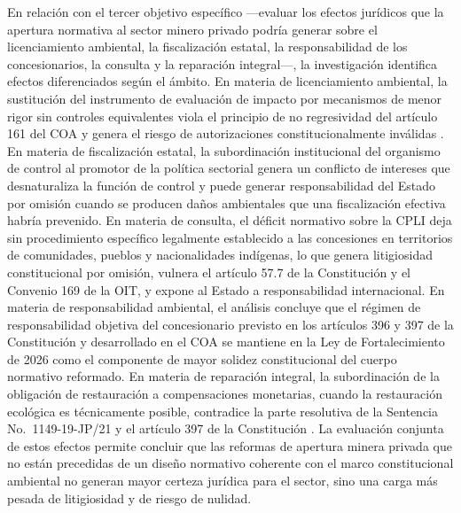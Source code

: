 En relación con el tercer objetivo específico —evaluar los efectos jurídicos que la apertura normativa al sector minero privado podría generar sobre el licenciamiento ambiental, la fiscalización estatal, la responsabilidad de los concesionarios, la consulta y la reparación integral—, la investigación identifica efectos diferenciados según el ámbito. En materia de licenciamiento ambiental, la sustitución del instrumento de evaluación de impacto por mecanismos de menor rigor sin controles equivalentes viola el principio de no regresividad del artículo 161 del COA y genera el riesgo de autorizaciones constitucionalmente inválidas \parencite{coa_2017}. En materia de fiscalización estatal, la subordinación institucional del organismo de control al promotor de la política sectorial genera un conflicto de intereses que desnaturaliza la función de control y puede generar responsabilidad del Estado por omisión cuando se producen daños ambientales que una fiscalización efectiva habría prevenido. En materia de consulta, el déficit normativo sobre la CPLI deja sin procedimiento específico legalmente establecido a las concesiones en territorios de comunidades, pueblos y nacionalidades indígenas, lo que genera litigiosidad constitucional por omisión, vulnera el artículo 57.7 de la Constitución y el Convenio 169 de la OIT, y expone al Estado a responsabilidad internacional. En materia de responsabilidad ambiental, el análisis concluye que el régimen de responsabilidad objetiva del concesionario previsto en los artículos 396 y 397 de la Constitución y desarrollado en el COA se mantiene en la Ley de Fortalecimiento de 2026 como el componente de mayor solidez constitucional del cuerpo normativo reformado. En materia de reparación integral, la subordinación de la obligación de restauración a compensaciones monetarias, cuando la restauración ecológica es técnicamente posible, contradice la parte resolutiva de la Sentencia No.\ 1149-19-JP/21 y el artículo 397 de la Constitución \parencite{cce_1149_19_jp_21,cre_2008}. La evaluación conjunta de estos efectos permite concluir que las reformas de apertura minera privada que no están precedidas de un diseño normativo coherente con el marco constitucional ambiental no generan mayor certeza jurídica para el sector, sino una carga más pesada de litigiosidad y de riesgo de nulidad.



